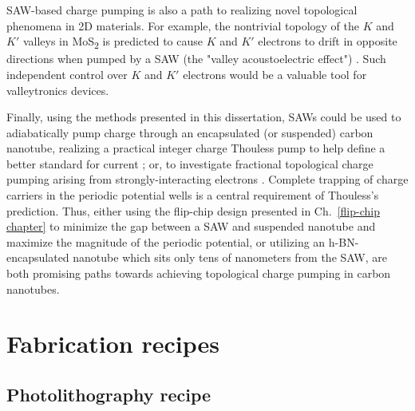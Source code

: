 \documentclass[double,12pt,1in,seploa]{beavtex}
\let\Oldsection\section
\renewcommand{\section}{\FloatBarrier\Oldsection}
\begin{document}
SAW-based charge pumping is also a path to realizing novel topological phenomena in 2D materials. For example, the nontrivial topology of the $K$ and $K'$ valleys in MoS\textsubscript{2} is predicted to cause $K$ and $K'$ electrons to drift in opposite directions when pumped by a SAW (the "valley acoustoelectric effect") \cite{kalameitsev_valley_2019}. Such independent control over $K$ and $K'$ electrons would be a valuable tool for valleytronics devices.

Finally, using the methods presented in this dissertation, SAWs could be used to adiabatically pump charge through an encapsulated (or suspended) carbon nanotube, realizing a practical integer charge Thouless pump to help define a better standard for current \cite{pekola_single-electron_2013,scherer_singleelectron_2019}; or, to investigate fractional topological charge pumping arising from strongly-interacting electrons \cite{novikov_devils_2005}. Complete trapping of charge carriers in the periodic potential wells is a central requirement of Thouless's prediction. Thus, either using the flip-chip design presented in Ch.\ \ref{flip-chip chapter} to minimize the gap between a SAW and suspended nanotube and maximize the magnitude of the periodic potential, or utilizing an h-BN-encapsulated nanotube which sits only tens of nanometers from the SAW, are both promising paths towards achieving topological charge pumping in carbon nanotubes.


\pagebreak




\pagebreak

\appendix
\chapter{Fabrication recipes}

\section{Photolithography recipe} \label{photolithography recipe}
\end{document}
